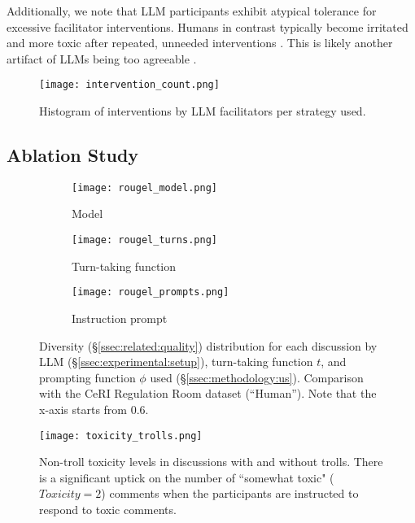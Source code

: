 Additionally, we note that LLM participants exhibit atypical tolerance for excessive facilitator interventions. Humans in contrast typically become irritated and more toxic after repeated, unneeded interventions \citep{schaffner_community_guidelines, make_reddit_great, proactive_moderation, cresci_pesonalized_interventions}. This is likely another artifact of LLMs being too agreeable \citep{park2023game, anthis_2025}.

\begin{figure}[t]
	\centering
	\texttt{[image: intervention\_count.png]}
	\caption{Histogram of interventions by LLM facilitators per strategy used.}
	\label{fig:intervention_count}
\end{figure}


\subsection{Ablation Study}
\label{ssec:results:ablation}

\begin{figure*}[t]
    \begin{subfigure}{0.32\linewidth}
        \texttt{[image: rougel\_model.png]}
        \caption{Model}
        \label{fig:rougel_model}
    \end{subfigure}%
    \hfill
    \begin{subfigure}{0.32\linewidth}
        \texttt{[image: rougel\_turns.png]}
        \caption{Turn-taking function}
        \label{fig:rougel_turns}
    \end{subfigure}%
    \hfill
    \begin{subfigure}{0.32\linewidth}
        \texttt{[image: rougel\_prompts.png]}
        \caption{Instruction prompt}
        \label{fig:rougel_prompts}
    \end{subfigure}%

    \caption{Diversity (\S\ref{ssec:related:quality}) distribution for each discussion by LLM (\S\ref{ssec:experimental:setup}), turn-taking function $t$, and prompting function $\phi$ used (\S\ref{ssec:methodology:us}). Comparison with the CeRI Regulation Room dataset (``Human''). Note that the x-axis starts from $0.6$.}
    \label{fig:diversity}
\end{figure*}

\begin{figure}[t]
	\centering
	\texttt{[image: toxicity\_trolls.png]}
	\caption{Non-troll toxicity levels in discussions with and without trolls. There is a significant uptick on the number of ``somewhat toxic" ($Toxicity=2$) comments when the participants are instructed to respond to toxic comments.}
	\label{fig:toxicity_trolls}
\end{figure}

